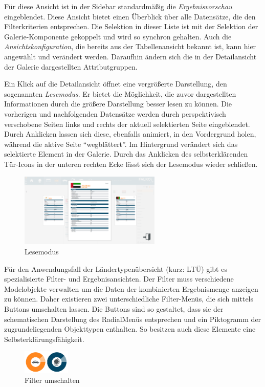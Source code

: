 Für diese Ansicht ist in der Sidebar standardmäßig die \textit{Ergebnisvorschau} eingeblendet. Diese Ansicht bietet einen Überblick über alle Datensätze, die den Filterkriterien entsprechen. Die Selektion in dieser Liste ist mit der Selektion der Galerie-Komponente gekoppelt und wird so synchron gehalten. Auch die \textit{Ansichtskonfiguration}, die bereits aus der Tabellenansicht bekannt ist, kann hier angewählt und verändert werden. Daraufhin ändern sich die in der Detailansicht der Galerie dargestellten Attributgruppen.\par
Ein Klick auf die Detailansicht öffnet eine vergrößerte Darstellung, den sogenannten \textit{Lesemodus}. Er bietet die Möglichkeit, die zuvor dargestellten Informationen durch die größere Darstellung besser lesen zu können. Die vorherigen und nachfolgenden Datensätze werden durch perspektivisch verschobene Seiten links und rechts der aktuell selektierten Seite eingeblendet. Durch Anklicken lassen sich diese, ebenfalls animiert, in den Vordergrund holen, während die aktive Seite \enquote{wegblättert}. Im Hintergrund verändert sich das selektierte Element in der Galerie. Durch das Anklicken des selbsterklärenden Tür-Icons in der unteren rechten Ecke lässt sich der Lesemodus wieder schließen.\par
\begin{figure}[H]
 \centering
 \includegraphics[width=0.6\textwidth]{grafiken/readmode.png}
 \caption{Lesemodus}
 \label{fig:readmode}
\end{figure}
Für den Anwendungsfall der Ländertypenübersicht (kurz: LTÜ) gibt es spezialisierte Filter- und Ergebnisansichten. Der Filter muss verschiedene Modelobjekte verwalten um die Daten der kombinierten Ergebnismenge anzeigen zu können. Daher existieren zwei unterschiedliche Filter-Menüs, die sich mittels Buttons umschalten lassen. Die Buttons sind so gestaltet, dass sie der schematischen Darstellung des RadialMenüs entsprechen und ein Piktogramm der zugrundeliegenden Objekttypen enthalten. So besitzen auch diese Elemente eine Selbsterklärungsfähigkeit.
\begin{figure}[H]
 \centering
 \includegraphics[width=0.2\textwidth]{grafiken/filter_buttons.png}
 \caption{Filter umschalten}
 \label{fig:filterButtons}
\end{figure}
